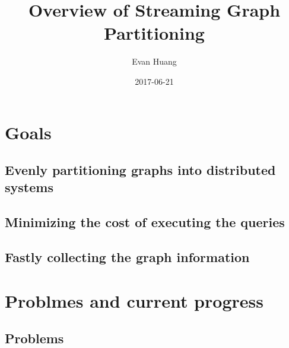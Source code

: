 \documentclass{article}
\title{Overview of Streaming Graph Partitioning}
\date{2017-06-21}
\author{Evan Huang}
\begin{document}
	\maketitle

	\newpage

	\tableofcontents


	\newpage
	\section{Goals}
	\subsection{Evenly partitioning graphs into distributed systems}
	\subsection{Minimizing the cost of executing the queries}
	\subsection{Fastly collecting the graph information}

	\newpage
	\section{Problmes and current progress}
	\subsection{Problems}
\end{document}
